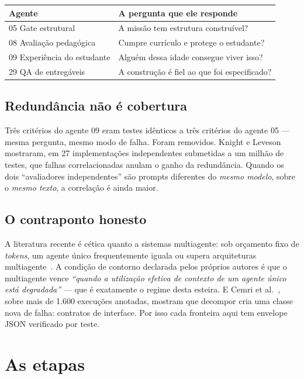 \documentclass[11pt,a4paper]{article}
\begin{document}
\begin{center}
\begin{tabular}{ll}
\toprule
\textbf{Agente} & \textbf{A pergunta que ele responde} \\
\midrule
05 Gate estrutural & A missão tem estrutura construível? \\
08 Avaliação pedagógica & Cumpre currículo e protege o estudante? \\
09 Experiência do estudante & Alguém dessa idade consegue viver isso? \\
29 QA de entregáveis & A construção é fiel ao que foi especificado? \\
\bottomrule
\end{tabular}
\end{center}

\subsection{Redundância não é cobertura}

Três critérios do agente 09 eram testes idênticos a três critérios do agente 05 --- mesma
pergunta, mesmo modo de falha. Foram removidos. Knight e Leveson~\cite{knight1986} mostraram,
em 27 implementações independentes submetidas a um milhão de testes, que falhas correlacionadas
anulam o ganho da redundância. Quando os dois ``avaliadores independentes'' são prompts
diferentes do \emph{mesmo modelo}, sobre o \emph{mesmo texto}, a correlação é ainda maior.

\subsection{O contraponto honesto}

A literatura recente é cética quanto a sistemas multiagente: sob orçamento fixo de
\emph{tokens}, um agente único frequentemente iguala ou supera arquiteturas
multiagente~\cite{tran2026}. A condição de contorno declarada pelos próprios autores é que o
multiagente vence \textit{``quando a utilização efetiva de contexto de um agente único está
degradada''} --- que é exatamente o regime desta esteira. E Cemri et al.~\cite{cemri2025},
sobre mais de 1.600 execuções anotadas, mostram que decompor cria uma classe nova de falha:
contratos de interface. Por isso cada fronteira aqui tem envelope JSON verificado por teste.

\section{As etapas}
\end{document}
